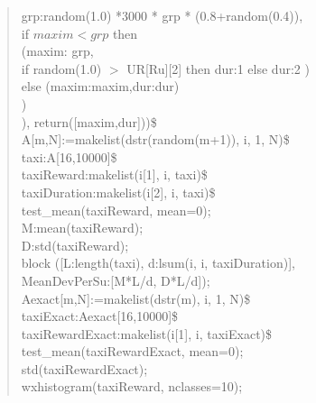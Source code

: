 \documentclass[]{article}
\begin{document}
\begin{quote}
\hspace*{20mm}grp:random(1.0) *3000 * grp * (0.8+random(0.4)),\\
\hspace*{20mm}if $maxim < grp$ then\\
\hspace*{30mm}(maxim: grp,\\
\hspace*{30mm}if random(1.0) $>$ UR[Ru][2] then dur:1 else dur:2 
\hspace*{20mm}) \\
\hspace*{20mm}else (maxim:maxim,dur:dur)\\
\hspace*{10mm})\\
), return([maxim,dur]))\$\\

A[m,N]:=makelist(dstr(random(m+1)), i, 1, N)\$\\
taxi:A[16,10000]\$\\
taxiReward:makelist(i[1], i, taxi)\$\\
taxiDuration:makelist(i[2], i, taxi)\$\\
test\_mean(taxiReward, mean=0);\\
M:mean(taxiReward);\\
D:std(taxiReward);\\
block ([L:length(taxi), d:lsum(i, i, taxiDuration)],  \\  
MeanDevPerSu:[M*L/d, D*L/d]);\\
Aexact[m,N]:=makelist(dstr(m), i, 1, N)\$\\
taxiExact:Aexact[16,10000]\$\\
taxiRewardExact:makelist(i[1], i, taxiExact)\$\\
test\_mean(taxiRewardExact, mean=0);\\
std(taxiRewardExact);\\
wxhistogram(taxiReward, nclasses=10);	
\end{quote}
\end{document}
